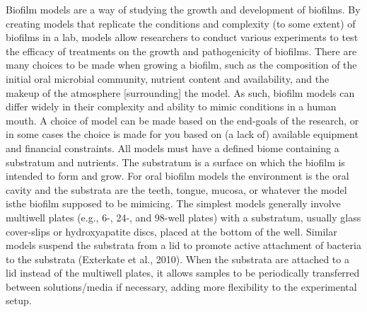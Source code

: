 \documentclass[
  letterpaper,
]{book}
\begin{document}
Biofilm models are a way of studying the growth and development of
biofilms. By creating models that replicate the conditions and
complexity (to some extent) of biofilms in a lab, models allow
researchers to conduct various experiments to test the efficacy of
treatments on the growth and pathogenicity of biofilms. There are many
choices to be made when growing a biofilm, such as the composition of
the initial oral microbial community, nutrient content and availability,
and the makeup of the atmosphere {[}surrounding{]} the model. As such,
biofilm models can differ widely in their complexity and ability to
mimic conditions in a human mouth. A choice of model can be made based
on the end-goals of the research, or in some cases the choice is made
for you based on (a lack of) available equipment and financial
constraints. All models must have a defined biome containing a
substratum and nutrients. The substratum is a surface on which the
biofilm is intended to form and grow. For oral biofilm models the
environment is the oral cavity and the substrata are the teeth, tongue,
mucosa, or whatever the model isthe biofilm supposed to be mimicing. The
simplest models generally involve multiwell plates (e.g., 6-, 24-, and
98-well plates) with a substratum, usually glass cover-slips or
hydroxyapatite discs, placed at the bottom of the well. Similar models
suspend the substrata from a lid to promote active attachment of
bacteria to the substrata (Exterkate et al., 2010). When the substrata
are attached to a lid instead of the multiwell plates, it allows samples
to be periodically transferred between solutions/media if necessary,
adding more flexibility to the experimental setup.
\end{document}
